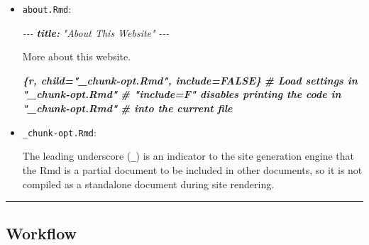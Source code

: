 \documentclass[
  a4paper,
  twoside,
  openright]{book}
\newenvironment{Shaded}{\begin{snugshade}}{\end{snugshade}}
\newcommand{\AnnotationTok}[1]{\textcolor[rgb]{0.56,0.35,0.01}{\textbf{\textit{#1}}}}
\newcommand{\CommentTok}[1]{\textcolor[rgb]{0.56,0.35,0.01}{\textit{#1}}}
\newcommand{\InformationTok}[1]{\textcolor[rgb]{0.56,0.35,0.01}{\textbf{\textit{#1}}}}
\newcommand{\NormalTok}[1]{#1}
\theoremstyle{definition}
\theoremstyle{definition}
\theoremstyle{definition}
\theoremstyle{definition}
\theoremstyle{remark}
\begin{document}
\begin{itemize}
\item
  \texttt{about.Rmd}:

\begin{Shaded}
\begin{Highlighting}[]
\CommentTok{{-}{-}{-}}
\AnnotationTok{title:}\CommentTok{ "About This Website"}
\CommentTok{{-}{-}{-}}

\NormalTok{More about this website.}

\InformationTok{\textasciigrave{}\textasciigrave{}\textasciigrave{}\{r, child="\_chunk{-}opt.Rmd", include=FALSE\}}
\InformationTok{\# Load settings in "\_chunk{-}opt.Rmd"}
\InformationTok{\# "include=F" disables printing the code in "\_chunk{-}opt.Rmd"}
\InformationTok{\# into the current file}
\InformationTok{\textasciigrave{}\textasciigrave{}\textasciigrave{}}
\end{Highlighting}
\end{Shaded}
\item
  \texttt{\_chunk-opt.Rmd}:

\begin{Shaded}
\end{Shaded}

  The leading underscore (\texttt{\_}) is an indicator to the site generation engine that the Rmd is a partial document to be included in other documents, so it is not compiled as a standalone document during site rendering.
\end{itemize}

\begin{center}\rule{0.5\linewidth}{0.5pt}\end{center}

\subsection*{Workflow}\label{workflow}
\end{document}
